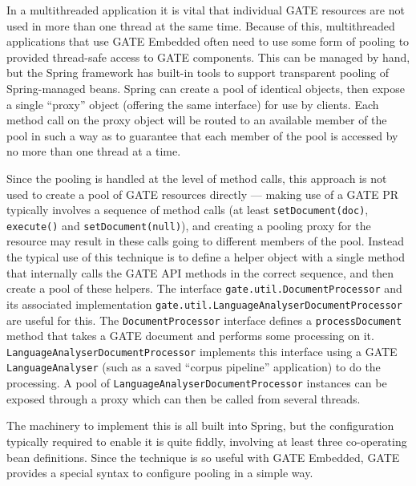 
In a multithreaded application it is vital that individual GATE resources are
not used in more than one thread at the same time.  Because of this,
multithreaded applications that use GATE Embedded often need to use some form
of pooling to provided thread-safe access to GATE components.  This can be
managed by hand, but the Spring framework has built-in tools to support
transparent pooling of Spring-managed beans.  Spring can create a pool of
identical objects, then expose a single ``proxy'' object (offering the same
interface) for use by clients.  Each method call on the proxy object will be
routed to an available member of the pool in such a way as to guarantee that
each member of the pool is accessed by no more than one thread at a time.

Since the pooling is handled at the level of method calls, this approach is not
used to create a pool of GATE resources directly --- making use of a GATE PR
typically involves a sequence of method calls (at least \verb|setDocument(doc)|,
\verb|execute()| and \verb|setDocument(null)|), and creating a pooling proxy
for the resource may result in these calls going to different members of the
pool.  Instead the typical use of this technique is to define a helper object
with a single method that internally calls the GATE API methods in the correct
sequence, and then create a pool of these helpers.  The interface
\verb|gate.util.DocumentProcessor| and its associated implementation
\verb|gate.util.LanguageAnalyserDocumentProcessor| are useful for this.  The
\verb|DocumentProcessor| interface defines a \verb|processDocument| method that
takes a GATE document and performs some processing on it.
\verb|LanguageAnalyserDocumentProcessor| implements this interface using a GATE
\verb|LanguageAnalyser| (such as a saved ``corpus pipeline'' application) to do
the processing.  A pool of \verb|LanguageAnalyserDocumentProcessor| instances
can be exposed through a proxy which can then be called from several threads.

The machinery to implement this is all built into Spring, but the configuration
typically required to enable it is quite fiddly, involving at least three
co-operating bean definitions.  Since the technique is so useful with GATE
Embedded, GATE provides a special syntax to configure pooling in a simple way.

